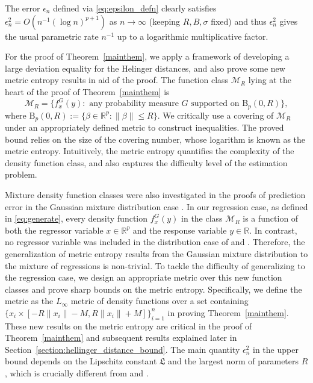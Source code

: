 \documentclass[11pt]{article}
\numberwithin{equation}{section}
\newcommand{\RS}{\mathbb{R}}
\newcommand{\ball}{\mathrm{B}}
\newcommand{\lipsz}{\mathfrak{L}}
\begin{document}

The error $\epsilon_n$ defined via \eqref{eq:epsilon_defn} clearly satisfies $\epsilon^2_n = O(n^{-1} (\log n)^{p+1})$ as $n \rightarrow \infty$ (keeping $R, B, \sigma$ fixed) and thus $\epsilon_n^2$ gives the usual parametric rate $n^{-1}$ up to a logarithmic multiplicative factor. 

For the proof of Theorem~\ref{mainthem}, we apply a framework of developing a large deviation equality for the Helinger distances, and also prove some new metric entropy results in aid of the proof. The function class $\mathcal{M}_R$ lying at the heart of the proof of Theorem~\ref{mainthem} is
\begin{equation}
\mathcal{M}_R  = \{ f^G_x(y) : \text{ any probability measure } G \text{ supported on } \ball_p(0,R) \},
\label{eq:M_defn}
\end{equation}
where $\ball_p(0,R) := \{\beta \in \mathbb{R}^p : \|\beta\| \leq R\}$. We critically use a covering of $\mathcal{M}_R$ under an appropriately defined metric to construct inequalities. The proved bound relies on the size of the covering number, whose logarithm is known as the metric entropy. Intuitively, the metric entropy quantifies the complexity of the density function class, and also captures the difficulty level of the estimation problem. 

Mixture density function classes were also investigated in the proofs of prediction error in the Gaussian mixture distribution case \citep{jiang2009general,saha2020nonparametric}. In our regression case, as defined in  \eqref{eq:generate}, every density function $f^G_x(y)$ in the class $\mathcal{M}_R$ is a function of both the regressor variable $x\in \RS^p$ and the response variable $y \in \RS$. In contrast, no regressor variable was included in the distribution case of \citet{jiang2009general} and \citet{saha2020nonparametric}. Therefore, the generalization of metric entropy results from the Gaussian mixture distribution to the mixture of regressions is non-trivial. To tackle the difficulty of generalizing to the regression case, we design an appropriate metric over this new function classes and prove sharp bounds on the metric entropy. Specifically, we define the metric as the $L_\infty$ metric of density functions over a set containing $\{x_i \times [-R\| x_i \| -M, R\| x_i \| +M]\}_{i=1}^n$ in proving Theorem~\ref{mainthem}. These new results on the metric entropy are critical in the proof of Theorem~\ref{mainthem} and subsequent results explained later in Section~\ref{section:hellinger_distance_bound}. The main quantity $\epsilon_n^2$ in the upper bound depends on the Lipschitz constant $\lipsz$ and the largest norm of parameters $R$, which is crucially different from \cite{jiang2009general} and \cite{saha2020nonparametric}. 
\end{document}
